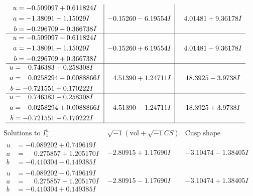 \documentclass[1p]{elsarticle_modified}
\theoremstyle{definition}
\newcommand{\I}{\sqrt{-1}}
\begin{document}
$$\begin{array}{c|c|c}
\begin{aligned}
u &= -0.509097 + 0.611824 I \\
a &= -1.38091 - 1.15029 I \\
b &= -0.296709 - 0.366738 I\end{aligned}
 & -0.15260 - 6.19554 I & \phantom{-}4.01481 + 9.36178 I \\ \hline\begin{aligned}
u &= -0.509097 - 0.611824 I \\
a &= -1.38091 + 1.15029 I \\
b &= -0.296709 + 0.366738 I\end{aligned}
 & -0.15260 + 6.19554 I & \phantom{-}4.01481 - 9.36178 I \\ \hline\begin{aligned}
u &= \phantom{-}0.746383 + 0.258308 I \\
a &= \phantom{-}0.0258294 - 0.0088866 I \\
b &= -0.721551 + 0.170222 I\end{aligned}
 & \phantom{-}4.51390 + 1.24711 I & \phantom{-}18.3925 - 3.9738 I \\ \hline\begin{aligned}
u &= \phantom{-}0.746383 - 0.258308 I \\
a &= \phantom{-}0.0258294 + 0.0088866 I \\
b &= -0.721551 - 0.170222 I\end{aligned}
 & \phantom{-}4.51390 - 1.24711 I & \phantom{-}18.3925 + 3.9738 I\\
 \hline 
 \end{array}$$\newpage$$\begin{array}{c|c|c}  
\text{Solutions to }I^u_{1}& \I (\text{vol} + \sqrt{-1}CS) & \text{Cusp shape}\\
 \hline 
\begin{aligned}
u &= -0.089202 + 0.749619 I \\
a &= \phantom{-}0.275857 + 1.205170 I \\
b &= -0.410304 - 0.149385 I\end{aligned}
 & -2.80915 + 1.17690 I & -3.10474 - 1.38405 I \\ \hline\begin{aligned}
u &= -0.089202 - 0.749619 I \\
a &= \phantom{-}0.275857 - 1.205170 I \\
b &= -0.410304 + 0.149385 I\end{aligned}
 & -2.80915 - 1.17690 I & -3.10474 + 1.38405 I \\ \hline\begin{aligned}

\end{aligned}
\end{array}$$
\end{document}
